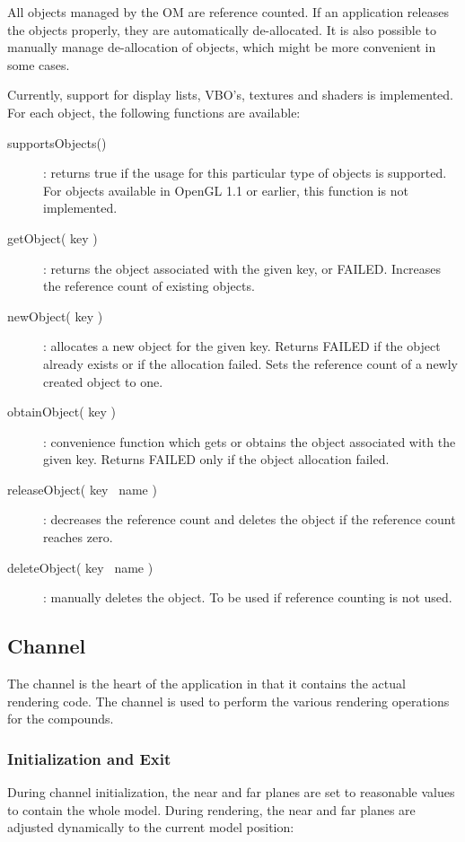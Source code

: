 \documentclass[10pt,a4]{scrartcl}
\begin{document}
All objects managed by the OM are reference counted. If an application
releases the objects properly, they are automatically de-allocated. It
is also possible to manually manage de-allocation of objects, which
might be more convenient in some cases.

Currently, support for display lists, VBO's, textures and shaders is
implemented. For each object, the following functions are available:

\begin{description}
\item[supportsObjects()]: returns true if the usage for this particular
  type of objects is supported. For objects available in OpenGL 1.1 or
  earlier, this function is not implemented.
\item[getObject( key )]: returns the object associated with the given
  key, or FAILED. Increases the reference count of existing objects.
\item[newObject( key )]: allocates a new object for the given
  key. Returns FAILED if the object already exists or if the allocation
  failed. Sets the reference count of a newly created object to one.
\item[obtainObject( key )]: convenience function which gets or obtains
  the object associated with the given key. Returns FAILED only if the
  object allocation failed.
\item[releaseObject( key \textbar\ name )]: decreases the reference count and
  deletes the object if the reference count reaches zero.
\item[deleteObject( key \textbar\ name )]: manually deletes the object. To be
  used if reference counting is not used.
\end{description}


\subsection{Channel}

The channel is the heart of the application in that it contains the
actual rendering code. The channel is used to perform the various rendering
operations for the compounds.

\subsubsection{Initialization and Exit}

During channel initialization, the near and far planes are set to
reasonable values to contain the whole model. During rendering, the near
and far planes are adjusted dynamically to the current model position:
\end{document}
